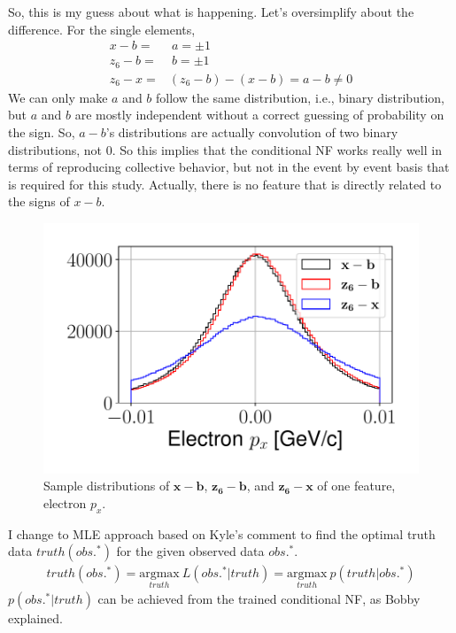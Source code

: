 So, this is my guess about what is happening. Let's oversimplify about the difference. For the single elements,
\begin{align}
    x -b =& ~a = \pm 1\\
    z_6-b =& ~b = \pm 1\\
    z_6 -x =& (z_6-b) - (x-b) = a- b \neq 0
\end{align}
We can only make $a$ and $b$ follow the same distribution, i.e., binary distribution, but $a$ and $b$ are mostly independent without a correct guessing of probability on the sign. So, $a-b$'s distributions are actually convolution of two binary distributions, not 0. So this implies that the conditional NF works really well in terms of reproducing collective behavior, but not in the event by event basis that is required for this study. Actually, there is no feature that is directly related to the signs of $x-b$.


\begin{figure}[htb]
    \centering
    \includegraphics{Chapters/Ch3-Simulations/normalizing_flows/pics/MeetingFigures/Sangbaek/elec_px.pdf}
    \caption{Sample distributions of $\mathbf{x}-\mathbf{b}$, $\mathbf{z_6}-\mathbf{b}$, and $\mathbf{z_6}-\mathbf{x}$ of one feature, electron $p_x$.}
    \label{fig:electron_px}
\end{figure}


I change to MLE approach based on Kyle's comment to find the optimal truth data $truth(obs.^{*})$ for the given observed data $obs.^{*}$. 
\begin{align}
truth(obs.^{*}) = \underset{truth}{\text{argmax}}~ L(obs.^{*}|truth) = \underset{truth}{\text{argmax}}~ p(truth|obs.^{*}) 
\end{align}
$p(obs.^{*}|truth)$ can be achieved from the trained conditional NF, as Bobby explained.







